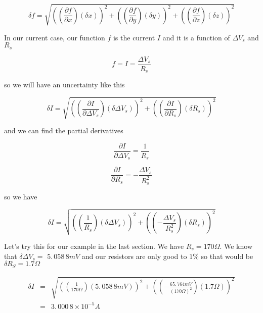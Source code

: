 \begin{equation*}
	\delta f=\sqrt{\left( \left( \frac{\partial f}{\partial x}\right)\left(\delta x\right) \right) ^{2}+\left( \left( \frac{\partial f}{\partial y}\right) \left( \delta y\right) \right) ^{2}+\left( \left( \frac{\partial f}{\partial z}\right) \left( \delta z\right) \right) ^{2}}
\end{equation*}

In our current case, our function $f$ is the current $I$ and it is a function of $\Delta V_{s}$ and $R_{s}$ 

\begin{equation*}
	f=I=\frac{\Delta V_{s}}{R_{s}}
\end{equation*}

\noindent so we will have an uncertainty like this

\begin{equation*}
	\delta I=\sqrt{\left( \left( \frac{\partial I}{\partial \Delta V_{s}}\right) \left( \delta \Delta V_{s}\right) \right) ^{2}+\left( \left( \frac{\partial I}{\partial R_{s}}\right) \left( \delta R_{s}\right) \right) ^{2}}
\end{equation*}

\noindent and we can find the partial derivatives

\begin{equation*}
	\frac{\partial I}{\partial \Delta V_{s}}=\frac{1}{R_{s}}
\end{equation*}

\begin{equation*}
	\frac{\partial I}{\partial R_{s}}=-\frac{\Delta V_{s}}{R_{s}^{2}}
\end{equation*}

\noindent so we have 

\begin{equation*}
	\delta I=\sqrt{\left( \left( \frac{1}{R_{s}}\right) \left( \delta \Delta V_{s}\right) \right) ^{2}+\left( \left( -\frac{\Delta V_{s}}{R_{s}^{2}}\right) \left( \delta R_{s}\right) \right) ^{2}}
\end{equation*}

Let's try this for our example in the last section. We have $R_{s}=170\unit{\Omega}.$ We know that $\delta \Delta V_{s}=$ $5.\,\allowbreak 058\,8\unit{mV}$ and our resistors are only good to $1\%$ so that would be $\delta R_{S}=1.7\unit{\Omega}$

\begin{eqnarray*}
	\delta I &=&\sqrt{\left( \left( \frac{1}{170\unit{\Omega}}\right) \left( 5.\,\allowbreak 058\,8\unit{mV}\right) \right) ^{2}+\left(
	\left( -\frac{65.\,\allowbreak 764\unit{mV}}{\left( 170\unit{\Omega}\right) ^{2}}\right) \left( 1.7\unit{\Omega}\right) \right) ^{2}} \\
            &=&3.\,\allowbreak 000\,8\times 10^{-5}\unit{A}
\end{eqnarray*}

